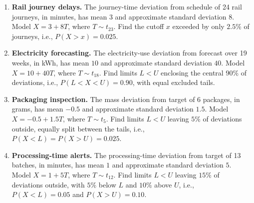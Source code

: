 \begin{enumerate}[leftmargin=*,itemsep=12pt,parsep=0pt,topsep=6pt]
		\item \textbf{Rail journey delays.} The journey-time deviation from schedule of 24 rail journeys, in minutes, has mean $3$ and approximate standard deviation $8$. Model $X=3+8T$, where $T\sim t_{23}$. Find the cutoff $x$ exceeded by only $2.5\%$ of journeys, i.e., $P(X>x)=0.025$.
		\item \textbf{Electricity forecasting.} The electricity-use deviation from forecast over 19 weeks, in kWh, has mean $10$ and approximate standard deviation $40$. Model $X=10+40T$, where $T\sim t_{18}$. Find limits $L<U$ enclosing the central $90\%$ of deviations, i.e., $P(L<X<U)=0.90$, with equal excluded tails.
		\item \textbf{Packaging inspection.} The mass deviation from target of 6 packages, in grams, has mean $-0.5$ and approximate standard deviation $1.5$. Model $X=-0.5+1.5T$, where $T\sim t_{5}$. Find limits $L<U$ leaving $5\%$ of deviations outside, equally split between the tails, i.e., $P(X<L)=P(X>U)=0.025$.
		\item \textbf{Processing-time alerts.} The processing-time deviation from target of 13 batches, in minutes, has mean $1$ and approximate standard deviation $5$. Model $X=1+5T$, where $T\sim t_{12}$. Find limits $L<U$ leaving $15\%$ of deviations outside, with $5\%$ below $L$ and $10\%$ above $U$, i.e., $P(X<L)=0.05$ and $P(X>U)=0.10$.
	\end{enumerate}
	
